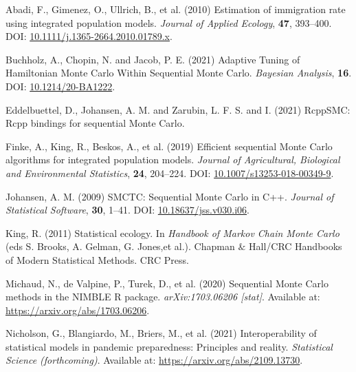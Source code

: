 \documentclass[
  10pt,
  a4paper,
]{article}
\newlength{\cslhangindent}
\newlength{\cslentryspacingunit} %
\newenvironment{CSLReferences}[2] %
 {%
  \setlength{\parindent}{0pt}
  \ifodd #1
  \let\oldpar\par
  \def\par{\hangindent=\cslhangindent\oldpar}
  \fi
  \setlength{\parskip}{#2\cslentryspacingunit}
 }%
 {}
\begin{document}
\hypertarget{refs}{}
\begin{CSLReferences}{1}{0}
\leavevmode{}%
Abadi, F., Gimenez, O., Ullrich, B., et al. (2010) Estimation of
immigration rate using integrated population models. \emph{Journal of
Applied Ecology}, \textbf{47}, 393--400. DOI:
\href{https://doi.org/10.1111/j.1365-2664.2010.01789.x}{10.1111/j.1365-2664.2010.01789.x}.

\leavevmode{}%
Buchholz, A., Chopin, N. and Jacob, P. E. (2021) Adaptive {Tuning} of
{Hamiltonian Monte Carlo Within Sequential Monte Carlo}. \emph{Bayesian
Analysis}, \textbf{16}. DOI:
\href{https://doi.org/10.1214/20-BA1222}{10.1214/20-BA1222}.

\leavevmode{}%
Eddelbuettel, D., Johansen, A. M. and Zarubin, L. F. S. and I. (2021)
{RcppSMC}: {Rcpp} bindings for sequential {Monte Carlo}.

\leavevmode{}%
Finke, A., King, R., Beskos, A., et al. (2019) Efficient sequential
{Monte Carlo} algorithms for integrated population models. \emph{Journal
of Agricultural, Biological and Environmental Statistics}, \textbf{24},
204--224. DOI:
\href{https://doi.org/10.1007/s13253-018-00349-9}{10.1007/s13253-018-00349-9}.

\leavevmode{}%
Johansen, A. M. (2009) {SMCTC}: {Sequential Monte Carlo} in {C}++.
\emph{Journal of Statistical Software}, \textbf{30}, 1--41. DOI:
\href{https://doi.org/10.18637/jss.v030.i06}{10.18637/jss.v030.i06}.

\leavevmode{}%
King, R. (2011) Statistical ecology. In \emph{Handbook of {Markov Chain
Monte Carlo}} (eds S. Brooks, A. Gelman, G. Jones,et al.). Chapman
{\(\&\)} {Hall}/{CRC Handbooks} of {Modern Statistical Methods}. {CRC
Press}.

\leavevmode{}%
Michaud, N., de Valpine, P., Turek, D., et al. (2020) Sequential {Monte
Carlo} methods in the {NIMBLE R} package. \emph{arXiv:1703.06206
{[}stat{]}}. Available at: \url{https://arxiv.org/abs/1703.06206}.

\leavevmode{}%
Nicholson, G., Blangiardo, M., Briers, M., et al. (2021)
Interoperability of statistical models in pandemic preparedness:
Principles and reality. \emph{Statistical Science (forthcoming)}.
Available at: \url{https://arxiv.org/abs/2109.13730}.

\end{CSLReferences}
\end{document}
